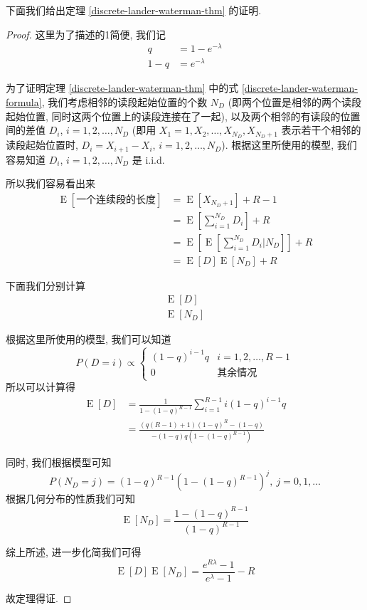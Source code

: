 下面我们给出定理 \ref{discrete-lander-waterman-thm} 的证明. 

\begin{proof}
这里为了描述的1简便, 我们记
\begin{align*}
q &= 1 - e^{-\lambda} \\
1-q &= e^{-\lambda}
\end{align*}

为了证明定理 \ref{discrete-lander-waterman-thm} 
中的式 \eqref{discrete-lander-waterman-formula}, 
我们考虑相邻的读段起始位置的个数 $N_D$ (即两个位置是相邻的两个读段起始位置, 
同时这两个位置上的读段连接在了一起), 
以及两个相邻的有读段的位置间的差值 $D_i$, $i=1,2,\ldots,N_D$ 
(即用 $X_1=1,X_2,\ldots,X_{N_D}, X_{N_D+1}$ 表示若干个相邻的读段起始位置时, 
$D_i=X_{i+1}-X_i$, $i=1,2,\ldots,N_D$). 
根据这里所使用的模型, 我们容易知道 $D_i$, $i=1,2,\ldots,N_D$ 是 i.i.d. 

所以我们容易看出来
\begin{align*}
\operatorname{E}[\text{一个连续段的长度}] &= \operatorname{E}[X_{N_D + 1}] +R-1 \\
&= \operatorname{E}[\sum_{i=1}^{N_D} D_i] +R \\
&= \operatorname{E}[\operatorname{E}[\sum_{i=1}^{N_D} D_i|N_D]] +R \\
&= \operatorname{E}[D] \operatorname{E}[N_D] +R
\end{align*}

下面我们分别计算
\begin{align*}
\operatorname{E}[D] \\
\operatorname{E}[N_D]
\end{align*}

根据这里所使用的模型, 我们可以知道
\[
P(D=i) \propto \begin{cases}
(1-q)^{i-1} q & i=1,2,\ldots,R-1 \\
0 & \text{其余情况}
\end{cases}
\]
所以可以计算得
\begin{align*}
\operatorname{E}[D] &= \frac{1}{1-(1-q)^{R-1}} \sum_{i=1}^{R-1} i (1-q)^{i-1} q \\
&= \frac{(q(R-1)+1)(1-q)^R-(1-q)}{-(1-q)q(1-(1-q)^{R-1})}
\end{align*}

同时, 我们根据模型可知
\[
P(N_D=j) = (1-q)^{R-1}(1-(1-q)^{R-1})^{j},\ j=0,1,\ldots
\]
根据几何分布的性质我们可知
\[
\operatorname{E}[N_D]=\frac{1-(1-q)^{R-1}}{(1-q)^{R-1}}
\]

综上所述, 进一步化简我们可得
\[
\operatorname{E}[D] \operatorname{E}[N_D] = \frac{e^{R\lambda} -1}{e^{\lambda}-1} -R
\]

故定理得证. 

\end{proof}

